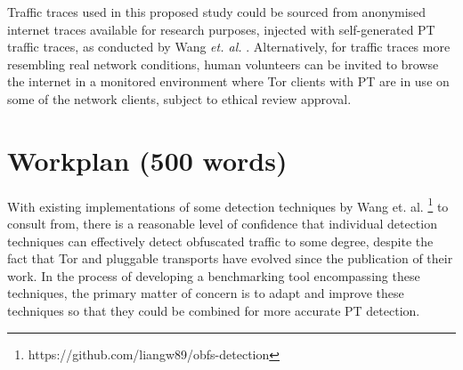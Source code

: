 \documentclass[11pt]{article}
\begin{document}
Traffic traces used in this proposed study could be sourced from anonymised internet traces available for research purposes, injected with self-generated PT traffic traces, as conducted by Wang \emph{et. al.} \cite[Sec. 3]{wang2015seeing}. Alternatively, for traffic traces more resembling real network conditions, human volunteers can be invited to browse the internet in a monitored environment where Tor clients with PT are in use on some of the network clients, subject to ethical review approval.


\section{Workplan (500 words)}

With existing implementations of some detection techniques by Wang et. al. \cite{wang2015seeing} \footnote{https://github.com/liangw89/obfs-detection} to consult from, there is a reasonable level of confidence that individual detection techniques can effectively detect obfuscated traffic to some degree, despite the fact that Tor and pluggable transports have evolved since the publication of their work. In the process of developing a benchmarking tool encompassing these techniques, the primary matter of concern is to adapt and improve these techniques so that they could be combined for more accurate PT detection. 




\footnotesize{}

\newpage
\appendix
\end{document}
